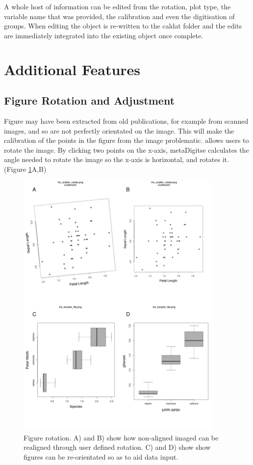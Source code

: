 \documentclass[article]{jss}
\newcommand{\fct}[1]{\code{#1()}}
\begin{document}
A whole host of information can be edited from the rotation, plot type, the variable name that was provided, the calibration and even the digitisation of groups. When editing the  object is re-written to the caldat folder and the edits are immediately integrated into the existing object once complete. 









\section{Additional Features}

\subsection{Figure Rotation and Adjustment}
Figure may have been extracted from old publications, for example from scanned images, and so are not perfectly orientated on the image. This will make the calibration of the points in the figure from the image problematic. \fct{metaDigitise} allows users to rotate the image. By clicking two points on the x-axis, metaDigitse calculates the angle needed to rotate the image so the x-axis is horizontal, and rotates it. (Figure \ref{fig:rotate}A,B)

\begin{figure}[!b] 
 \includegraphics[width=0.9\textwidth]{fig_rotate.pdf} 
 \caption{Figure rotation. A) and B) show how non-aligned imaged can be realigned through user defined rotation. C) and D) show show figures can be re-orientated so as to aid data input.}
\label{fig:rotate}
\end{figure}
\end{document}
